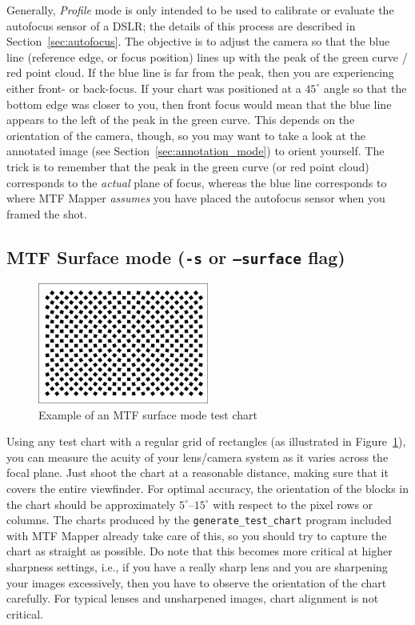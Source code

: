 \documentclass[a4paper]{article}
\begin{document}
Generally, \emph{Profile} mode is only intended to be used to calibrate or
evaluate the autofocus sensor of a DSLR; the details of this process are
described in Section~\ref{sec:autofocus}. The objective is to adjust the
camera so that the blue line (reference edge, or focus position) lines up
with the peak of the green curve / red point cloud. If the blue line is far
from the peak, then you are experiencing either front- or back-focus. If
your chart was positioned at a $45^\circ$ angle so that the bottom edge 
was closer to you, then front focus would mean that the blue line appears to
the left of the peak in the green curve. This depends on the orientation of
the camera, though, so you may want to take a look at the annotated image
(see Section~\ref{sec:annotation_mode}) to orient yourself. The trick is to
remember that the peak in the green curve (or red point cloud) corresponds
to the \emph{actual} plane of focus, whereas the blue line corresponds to
where MTF Mapper \emph{assumes} you have placed the autofocus sensor when you
framed the shot.

\subsection{MTF Surface mode (\texttt{-s} or \texttt{--surface} flag)}
\label{sec:surface_mode}
%
\begin{figure}
\centering
\includegraphics[width=0.5\textwidth]{figures/mtf_surface_test_chart}
\caption{Example of an MTF surface mode test chart}
\label{fig:surface_test_chart}
\end{figure}
%
Using any test chart with a regular grid of rectangles (as illustrated in
Figure~\ref{fig:surface_test_chart}), you can measure the acuity of your
lens/camera system as it varies across the focal plane. Just shoot the chart
at a reasonable distance, making sure that it covers the entire viewfinder.
For optimal accuracy, the orientation of the blocks in the chart should be
approximately $5^\circ$--$15^\circ$ with respect to the pixel rows or columns.
The charts produced by the \texttt{generate\_test\_chart} program included
with MTF Mapper already take care of this, so you should try to capture the
chart as straight as possible. Do note that this becomes more critical at
higher sharpness settings, i.e., if you have a really sharp lens and you are
sharpening your images excessively, then you have to observe the orientation
of the chart carefully. For typical lenses and unsharpened images, 
chart alignment is not critical.
\end{document}

